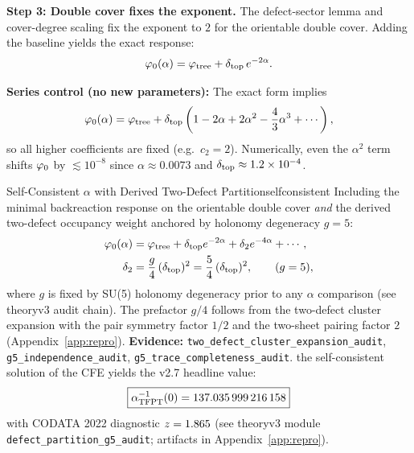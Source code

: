 \textbf{Step 3: Double cover fixes the exponent.}
The defect-sector lemma and cover-degree scaling fix the exponent to $2$ for the
orientable double cover. Adding the baseline yields the exact response:
\begin{equation}
    \varphi_0(\alpha) = \varphi_{\mathrm{tree}} + \delta_{\mathrm{top}}\,e^{-2\alpha}.
\end{equation}

\begin{remark}
\textbf{Series control (no new parameters):} The exact form implies
\begin{equation}
    \varphi_0(\alpha)=\varphi_{\mathrm{tree}}+\delta_{\mathrm{top}}\left(1-2\alpha+2\alpha^2-\frac{4}{3}\alpha^3+\cdots\right),
\end{equation}
so all higher coefficients are fixed (e.g.\ $c_2=2$). Numerically, even the
$\alpha^2$ term shifts $\varphi_0$ by $\lesssim 10^{-8}$ since
$\alpha\approx 0.0073$ and $\delta_{\mathrm{top}}\approx 1.2\times10^{-4}$.
\end{remark}

\begin{theorem}{Self-Consistent $\alpha$ with Derived Two-Defect Partition}{selfconsistent}
Including the minimal backreaction response on the orientable double cover \emph{and} the derived two-defect occupancy weight anchored by holonomy degeneracy $g=5$:
\begin{align}
    \varphi_0(\alpha) &= \varphi_{\mathrm{tree}} + \delta_{\mathrm{top}} e^{-2\alpha} + \delta_2 e^{-4\alpha} + \cdots,
    \label{eq:backreaction}\\
    \delta_2 &= \frac{g}{4}\,(\delta_{\mathrm{top}})^2 = \frac54\,(\delta_{\mathrm{top}})^2,
    \qquad (g=5),
\end{align}
where $g$ is fixed by SU(5) holonomy degeneracy prior to any $\alpha$ comparison (see theoryv3 audit chain).
The prefactor $g/4$ follows from the two-defect cluster expansion with the pair symmetry
factor $1/2$ and the two-sheet pairing factor $2$ (Appendix~\ref{app:repro}).
\textbf{Evidence:} \texttt{two\_defect\_cluster\_expansion\_audit}, \texttt{g5\_independence\_audit}, \texttt{g5\_trace\_completeness\_audit}.
the self-consistent solution of the CFE yields the v2.7 headline value:
\begin{equation}
    \boxed{\alpha^{-1}_{\text{TFPT}}(0) = \num[round-mode=places,round-precision=12]{\TFPTalphaInvGOverFourNum}}
\end{equation}
with CODATA 2022 diagnostic $z=\num[round-mode=places,round-precision=3]{\TFPTalphaZGOverFourNum}$ (see theoryv3 module \texttt{defect\_partition\_g5\_audit}; artifacts in Appendix~\ref{app:repro}).
\end{theorem}

